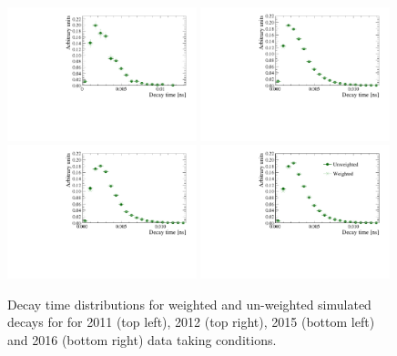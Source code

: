 \begin{figure}[tbp]
  \centering
    \includegraphics[width=0.49\textwidth]{./Figs/LifetimeMeasurement/2011_decaytime_Bd2KPi_weighting_impact.pdf}
    \includegraphics[width=0.49\textwidth]{./Figs/LifetimeMeasurement/2012_decaytime_Bd2KPi_weighting_impact.pdf}
    \includegraphics[width=0.49\textwidth]{./Figs/LifetimeMeasurement/2015_decaytime_Bd2KPi_weighting_impact.pdf}
    \includegraphics[width=0.49\textwidth]{./Figs/LifetimeMeasurement/2016_decaytime_Bd2KPi_weighting_impact.pdf}
  \caption{Decay time distributions for weighted and un-weighted \bdkpi simulated decays for for 2011 (top left), 2012 (top right), 2015 (bottom left) and 2016 (bottom right) data taking conditions.}
  \label{fig:BdToKpi_weightDecayTime}
\end{figure}


